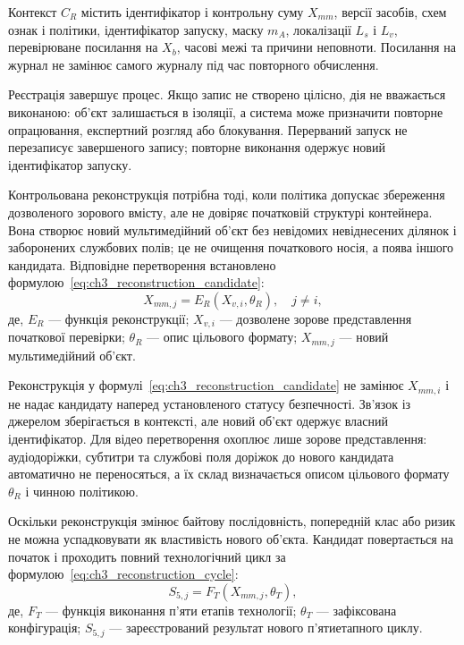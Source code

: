 Контекст $C_R$ містить ідентифікатор і контрольну суму $X_{mm}$, версії засобів, схем ознак і політики, ідентифікатор запуску, маску $m_A$, локалізації $L_s$ і $L_v$, перевірюване посилання на $X_b$, часові межі та причини неповноти. Посилання на журнал не замінює самого журналу під час повторного обчислення.

Реєстрація завершує процес. Якщо запис не створено цілісно, дія не вважається виконаною: об’єкт залишається в ізоляції, а система може призначити повторне опрацювання, експертний розгляд або блокування. Перерваний запуск не перезаписує завершеного запису; повторне виконання одержує новий ідентифікатор запуску.

Контрольована реконструкція потрібна тоді, коли політика допускає збереження дозволеного зорового вмісту, але не довіряє початковій структурі контейнера. Вона створює новий мультимедійний об’єкт без невідомих невіднесених ділянок і заборонених службових полів; це не очищення початкового носія, а поява іншого кандидата. Відповідне перетворення встановлено формулою~\eqref{eq:ch3_reconstruction_candidate}:
\begin{equation}
X_{mm,j}=E_R(X_{v,i},\theta_R),\quad j\neq i,
\label{eq:ch3_reconstruction_candidate}
\end{equation}
де, $E_R$ --- функція реконструкції; $X_{v,i}$ --- дозволене зорове представлення початкової перевірки; $\theta_R$ --- опис цільового формату; $X_{mm,j}$ --- новий мультимедійний об’єкт.

Реконструкція у формулі~\eqref{eq:ch3_reconstruction_candidate} не замінює $X_{mm,i}$ і не надає кандидату наперед установленого статусу безпечності. Зв’язок із джерелом зберігається в контексті, але новий об’єкт одержує власний ідентифікатор. Для відео перетворення охоплює лише зорове представлення: аудіодоріжки, субтитри та службові поля доріжок до нового кандидата автоматично не переносяться, а їх склад визначається описом цільового формату $\theta_R$ і чинною політикою.

Оскільки реконструкція змінює байтову послідовність, попередній клас або ризик не можна успадковувати як властивість нового об’єкта. Кандидат повертається на початок і проходить повний технологічний цикл за формулою~\eqref{eq:ch3_reconstruction_cycle}:
\begin{equation}
S_{5,j}=F_T(X_{mm,j},\theta_T),
\label{eq:ch3_reconstruction_cycle}
\end{equation}
де, $F_T$ --- функція виконання п’яти етапів технології; $\theta_T$ --- зафіксована конфігурація; $S_{5,j}$ --- зареєстрований результат нового п’ятиетапного циклу.

